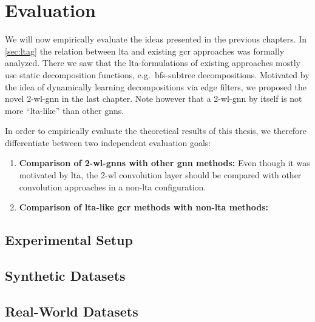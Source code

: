 \chapter{Evaluation}%
\label{sec:eval}

We will now empirically evaluate the ideas presented in the previous chapters.
In \cref{sec:ltag} the relation between \ac{lta} and existing \ac{gcr} approaches was formally analyzed.
There we saw that the \acs{lta}-formulations of existing approaches mostly use static decomposition functions, e.g.\ \acs{bfs}-subtree decompositions.
Motivated by the idea of dynamically learning decompositions via edge filters, we proposed the novel 2-\acs{wl}-\acs{gnn} in the last chapter.
Note however that a 2-\acs{wl}-\acs{gnn} by itself is not more ``\acs{lta}-like'' than other \acp{gnn}.

In order to empirically evaluate the theoretical results of this thesis, we therefore differentiate between two independent evaluation goals:
\begin{enumerate}[label={\textbf{\arabic*.}}]
	\item \textbf{Comparison of 2-\acs{wl}-\acsp{gnn} with other \ac{gnn} methods:}
		Even though it was motivated by \ac{lta}, the 2-\acs{wl} convolution layer should be compared with other convolution approaches in a non-\acs{lta} configuration.
	\item \textbf{Comparison of \acs{lta}-like \ac{gcr} methods with non-\acs{lta} methods:}
\end{enumerate}

\section{Experimental Setup}%
\label{sec:eval:setup}

\section{Synthetic Datasets}%
\label{sec:eval:synthetic}

\section{Real-World Datasets}%
\label{sec:eval:real}
